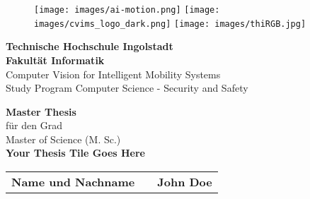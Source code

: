 

\begin{titlepage}	
	\begin{figure}[!h]
		\centering
			\texttt{[image: images/ai-motion.png]}	
			\hfill
			\texttt{[image: images/cvims\_logo\_dark.png]}	
			\hfill
			\texttt{[image: images/thiRGB.jpg]}	
		\end{figure}																			
	
	\begin{center}
		\hrulefill 
	\end{center}
	
	
	\begin{center}	
		\vspace{1cm}
		\huge\textbf{Technische Hochschule Ingolstadt}\\[1em]
		\Large \textbf{Fakultät Informatik}\\ 
		\normalsize
		Computer Vision for Intelligent Mobility Systems \\ 
		Study Program Computer Science - Security and Safety \\ [2.5em]
	\end{center}


	\begin{center}	
		\vspace{1cm}
		\Large \textbf{Master Thesis}\\ 
		\normalsize
		für den Grad \\ 
		Master of Science (M. Sc.) \\ [3.5em]
		\huge\textbf{Your Thesis Tile Goes Here}	 \\ [3.5em]
	\end{center}



	
	\begin{center}
		\vspace{1cm}
		\hspace{1cm}
		\begin{tabular}{r@{:}ll}
			\textbf{Name und Nachname} & & \textbf{John Doe}	\\ [3em]
			

\end{tabular}
\end{center}
\end{titlepage}
